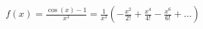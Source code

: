 \documentclass[preview]{standalone}
\begin{document}
\begin{align*}
f(x) = \frac{\cos(x) - 1}{x^2} = \frac{1}{x^2} \left( -\frac{x^2}{2!} + \frac{x^4}{4!} - \frac{x^6}{6!} + \dots \right)
\end{align*}
\end{document}
